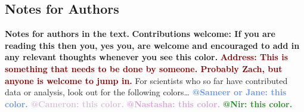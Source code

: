 \documentclass[fleqn,usenatbib]{mnras}
\makeatletter
\newcommand{\thoughts}[1]{\textcolor{BurntOrange}{\textbf{Contributions welcome: #1}}}
\newcommand{\todo}[1]{\textcolor{Maroon}{\textbf{Address: #1}}}
\newcommand{\atsameer}[1]{\textcolor{CornflowerBlue}{\textbf{@Sameer or Jane: #1}}}
\newcommand{\atcameron}[1]{\textcolor{Thistle}{\textbf{@Cameron: #1}}}
\newcommand{\atnastasha}[1]{\textcolor{Plum}{\textbf{@Nastasha: #1}}}
\newcommand{\atnir}[1]{\textcolor{ForestGreen}{\textbf{@Nir: #1}}}
\makeatother
\begin{document}


\subsection{Notes for Authors}
 
\textbf{Notes for authors in the text.}
\thoughts{If you are reading this then you, yes you, are welcome and encouraged to add in any relevant thoughts whenever you see this color.}
\todo{This is something that needs to be done by someone. Probably Zach, but anyone is welcome to jump in.}
For scientists who so far have contributed data or analysis, look out for the following colors\ldots
\atsameer{this color.}
\atcameron{this color.}
\atnastasha{this color.}
\atnir{this color.}
\end{document}
